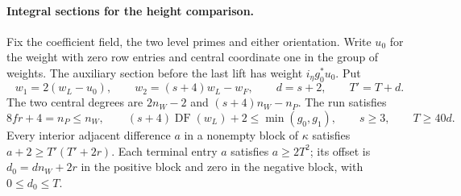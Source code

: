 \paragraph{Integral sections for the height comparison.}
\label{par:selected-height-sections}
\hypertarget{source-selected-height-sections}{}
\begin{established}
\label{hyp:height-section-weights}\label{cor:selected-height-sections-1}
Fix the coefficient field, the two level primes and either orientation.
Write \(u_0\) for the weight with zero row entries and central
coordinate one in the group of weights. The auxiliary section before
the last lift has weight \(i_\eta g_0^*u_0\). Put
\[
 w_1=2(w_L-u_0),\qquad w_2=(s+4)w_L-w_F,\qquad
 d=s+2,\qquad T'=T+d .
\]
The two central degrees are \(2n_W-2\) and \((s+4)n_W-n_P\).
The run satisfies
\[
 8fr+4=n_P\le n_W,\qquad (s+4)\operatorname{DF}(w_L)+2
       \le\min(g_0,g_1),\qquad s\ge3,\qquad T\ge40d .
\]
Every interior adjacent difference \(a\) in a nonempty block of
\(\kappa\) satisfies \(a+2\ge T'(T'+2r)\). Each terminal entry \(a\)
satisfies \(a\ge2T^2\); its offset is \(d_0=dn_W+2r\) in the
positive block and zero in the negative block, with \(0\le d_0\le T\).
\end{established}
